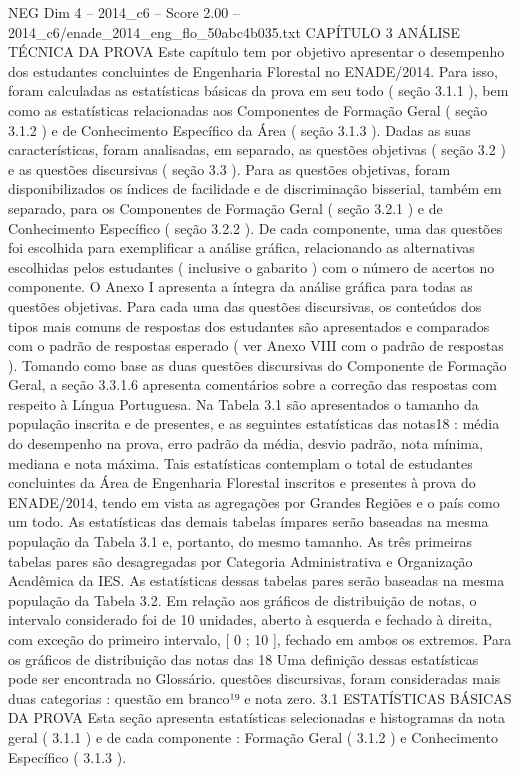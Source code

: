 \begin{textsample}{NEG Dim 4 – 2014\_c6 – Score 2.00 – 2014\_c6/enade\_2014\_eng\_flo\_50abc4b035.txt}  \label{ex:f4_neg_285}
CAPÍTULO 3 ANÁLISE TÉCNICA DA PROVA Este capítulo tem por objetivo apresentar o desempenho dos estudantes concluintes de Engenharia Florestal no ENADE/2014.
Para isso, foram calculadas as estatísticas básicas da prova em seu todo ( seção 3.1.1 ), bem como as estatísticas relacionadas aos Componentes de Formação Geral ( seção 3.1.2 ) e de Conhecimento Específico da Área ( seção 3.1.3 ).
Dadas as suas características, foram analisadas, em separado, as questões objetivas ( seção 3.2 ) e as questões discursivas ( seção 3.3 ).
Para as questões objetivas, foram disponibilizados os índices de facilidade e de discriminação bisserial, também em separado, para os Componentes de Formação Geral ( seção 3.2.1 ) e de Conhecimento Específico ( seção 3.2.2 ).
De cada componente, uma das questões foi escolhida para exemplificar a análise gráfica, relacionando as alternativas escolhidas pelos estudantes ( inclusive o gabarito ) com o número de acertos no componente.
O Anexo I apresenta a íntegra da análise gráfica para todas as questões objetivas.
Para cada uma das questões discursivas, os conteúdos dos tipos mais comuns de respostas dos estudantes são apresentados e comparados com o padrão de respostas esperado ( ver Anexo VIII com o padrão de respostas ).
Tomando como base as duas questões discursivas do Componente de Formação Geral, a seção 3.3.1.6 apresenta comentários sobre a correção das respostas com respeito à Língua Portuguesa.
Na Tabela 3.1 são apresentados o tamanho da população inscrita e de presentes, e as seguintes estatísticas das notas18 : média do desempenho na prova, erro padrão da média, desvio padrão, nota mínima, mediana e nota máxima.
Tais estatísticas contemplam o total de estudantes concluintes da Área de Engenharia Florestal inscritos e presentes à prova do ENADE/2014, tendo em vista as agregações por Grandes Regiões e o país como um todo.
As estatísticas das demais tabelas ímpares serão baseadas na mesma população da Tabela 3.1 e, portanto, do mesmo tamanho.
As três primeiras tabelas pares são desagregadas por Categoria Administrativa e Organização Acadêmica da IES.
As estatísticas dessas tabelas pares serão baseadas na mesma população da Tabela 3.2.
Em relação aos gráficos de distribuição de notas, o intervalo considerado foi de 10 unidades, aberto à esquerda e fechado à direita, com exceção do primeiro intervalo, [ 0 ; 10 ], fechado em ambos os extremos.
Para os gráficos de distribuição das notas das 18 Uma definição dessas estatísticas pode ser encontrada no Glossário. questões discursivas, foram consideradas mais duas categorias : questão em branco¹⁹ e nota zero. 3.1 ESTATÍSTICAS BÁSICAS DA PROVA Esta seção apresenta estatísticas selecionadas e histogramas da nota geral ( 3.1.1 ) e de cada componente : Formação Geral ( 3.1.2 ) e Conhecimento Específico ( 3.1.3 ).

\end{textsample}
